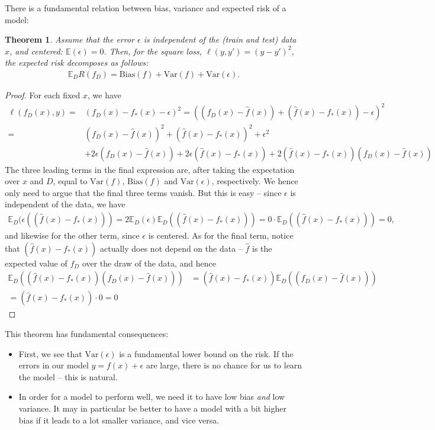 \documentclass{article}
\newcommand{\erw}{\mathbb{E}} %
\newtheorem{theorem}{Theorem}
\begin{document}
There is a fundamental relation between bias, variance and expected risk of a model:
\begin{theorem}
    Assume that the error $\epsilon$ is independent of the (train and test) data $x$, and centered: $\erw(\epsilon)=0$. Then, for the square loss, $\ell(y,y')=(y-y')^2$, the expected risk decomposes as follows:
    \begin{align*}
        \erw_D R(f_D) = \mathrm{Bias}(f) + \mathrm{Var}(f) + \mathrm{Var}(\epsilon).
    \end{align*}
\end{theorem}
\begin{proof}
    For each fixed $x$, we have
    \begin{align*}
        \ell(f_D(x),y) =& (f_D(x)-f_*(x)-\epsilon)^2 = \left((f_D(x) - \widehat{f}(x)) + (\widehat{f}(x)-f_*(x)) -\epsilon\right)^2 \\
        =& (f_D(x)-\widehat{f}(x))^2 + (\widehat{f}(x)- f_*(x))^2 +\epsilon^2 \\
        & +2 \epsilon (f_D(x)-\widehat{f}(x)) + 2\epsilon (\widehat{f}(x)- f_*(x)) + 2(\widehat{f}(x)- f_*(x))(f_D(x)-\widehat{f}(x))
    \end{align*}
    The three leading terms in the final expression are, after taking the expectation over $x$ and $D$, equal to $\mathrm{Var}(f)$, $\mathrm{Bias}(f)$ and $\mathrm{Var}(\epsilon)$, respectively. We hence only need to argue that the final three terms vanish. But this is easy -- since $\epsilon$ is independent of the data, we have
    \begin{align*}
        \erw_D(\epsilon ((\widehat{f}(x)- f_*(x))) = 2\erw_D(\epsilon) \erw_D((\widehat{f}(x)- f_*(x))) = 0 \cdot  \erw_D((\widehat{f}(x)- f_*(x))) =0,
    \end{align*}
    and likewise for the other term, since $\epsilon$ is centered. As for the final term, notice that $(\widehat{f}(x)- f_*(x))$ actually does not depend on the data -- $\widehat{f}$ is the expected value of $f_D$ over the draw of the data, and hence
    \begin{align*}
        \erw_D((\widehat{f}(x)- f_*(x))(f_D(x)-\widehat{f}(x)))& = (\widehat{f}(x)- f_*(x))\erw_D((f_D(x)-\widehat{f}(x))) \\= (\widehat{f}(x)- f_*(x))\cdot 0 = 0 
    \end{align*}
\end{proof}
This theorem has fundamental consequences:
\begin{itemize}
    \item First, we see that $\mathrm{Var}(\epsilon)$ is a fundamental lower bound on the risk. If the errors in our model $y=f(x)+\epsilon$ are large, there is no chance for us to learn the model -- this is natural.
    \item In order for a model to perform well, we need it to have low bias \emph{and} low variance. It may in particular be better to have a model with a bit higher bias if it leads to a lot smaller variance, and vice versa.
\end{itemize}
\end{document}
